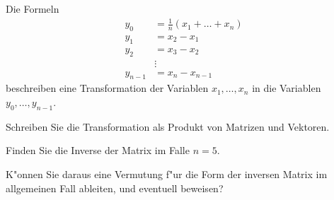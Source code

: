 Die Formeln \begin{align*}
y_0&=\frac1n(x_1+\dots + x_n)\\
y_1&=x_2-x_1\\
y_2&=x_3-x_2\\
&\vdots\\
y_{n-1}&=x_n-x_{n-1}
\end{align*}
beschreiben eine Transformation der Variablen $x_1,\dots,x_n$
in die Variablen $y_0,\dots,y_{n-1}$.
\begin{teilaufgaben}
\item Schreiben Sie die Transformation als Produkt von Matrizen und Vektoren.
\item Finden Sie die Inverse der Matrix im Falle $n=5$.
\item K"onnen Sie daraus eine Vermutung f"ur die Form der inversen Matrix im allgemeinen Fall
ableiten, und eventuell beweisen?
\end{teilaufgaben}

